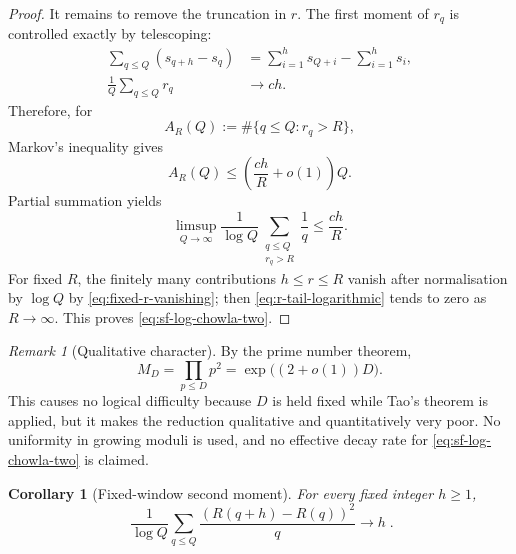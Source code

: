 \documentclass[11pt]{amsart}
\numberwithin{equation}{section}
\theoremstyle{plain}
\newtheorem{corollary}[theorem]{Corollary}
\theoremstyle{definition}
\theoremstyle{remark}
\newtheorem{remark}[theorem]{Remark}
\begin{document}
\begin{proof}
It remains to remove the truncation in $r$.  The first moment of $r_q$ is
controlled exactly by telescoping:
\begin{align}
\sum_{q\le Q}(s_{q+h}-s_q)
&=\sum_{i=1}^{h}s_{Q+i}-\sum_{i=1}^{h}s_i,
\label{eq:r-gap-telescope}\\
\frac1Q\sum_{q\le Q}r_q
&\longrightarrow ch.
\label{eq:r-gap-first-moment}
\end{align}
Therefore, for
\begin{equation}
\label{eq:r-tail-count}
A_R(Q):=\#\{q\le Q:r_q>R\},
\end{equation}
Markov's inequality gives
\begin{equation}
\label{eq:r-tail-Markov}
A_R(Q)\le\left(\frac{ch}{R}+o(1)\right)Q.
\end{equation}
Partial summation yields
\begin{equation}
\label{eq:r-tail-logarithmic}
\limsup_{Q\to\infty}\frac1{\log Q}
\sum_{\substack{q\le Q\\r_q>R}}\frac1q
\le\frac{ch}{R}.
\end{equation}
For fixed $R$, the finitely many contributions $h\le r\le R$ vanish after
normalisation by $\log Q$ by \eqref{eq:fixed-r-vanishing}; then
\eqref{eq:r-tail-logarithmic} tends to zero as $R\to\infty$.  This proves
\eqref{eq:sf-log-chowla-two}.
\end{proof}

\begin{remark}[Qualitative character]
\label{rem:sf-chowla-qualitative}
By the prime number theorem,
\begin{equation}
\label{eq:MD-growth}
M_D=\prod_{p\le D}p^2=\exp\bigl((2+o(1))D\bigr).
\end{equation}
This causes no logical difficulty because $D$ is held fixed while Tao's theorem
is applied, but it makes the reduction qualitative and quantitatively very poor.
No uniformity in growing moduli is used, and no effective decay rate for
\eqref{eq:sf-log-chowla-two} is claimed.
\end{remark}

\begin{corollary}[Fixed-window second moment]
\label{cor:fixed-window-variance}
For every fixed integer $h\ge1$,
\begin{equation}
\label{eq:fixed-window-variance}
\boxed{\;
\frac1{\log Q}\sum_{q\le Q}
\frac{(R(q+h)-R(q))^2}{q}\longrightarrow h
\;}. 
\end{equation}
\end{corollary}
\end{document}
